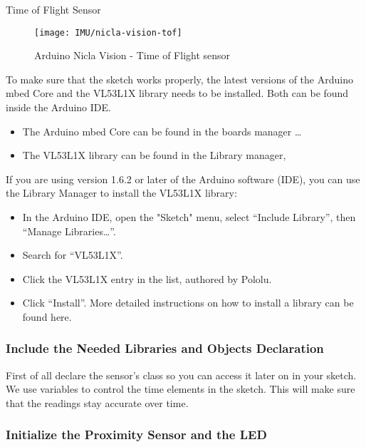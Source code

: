Time of Flight Sensor

\begin{figure}
    \centering
    
    \texttt{[image: IMU/nicla-vision-tof]}
    
    \caption{Arduino Nicla Vision - Time of Flight sensor}\label{Proximity}
\end{figure}


To make sure that the sketch works properly, the latest versions of the Arduino mbed Core and the VL53L1X library needs to be installed. Both can be found inside the Arduino IDE.

\begin{itemize}
  \item The Arduino mbed Core can be found in the boards manager \ldots
  \item The VL53L1X library can be found in the Library manager,
\end{itemize}

If you are using version 1.6.2 or later of the Arduino software (IDE), you can use the Library Manager to install the VL53L1X library:

\begin{itemize}
  \item In the Arduino IDE, open the "Sketch" menu, select ``Include Library'', then ``Manage Libraries\ldots ''.
  \item Search for ``VL53L1X''.
  \item Click the VL53L1X entry in the list, authored by Pololu.
  \item Click ``Install''. More detailed instructions on how to install a library can be found here.
\end{itemize}


\subsubsection{Include the Needed Libraries and Objects Declaration}


First of all declare the sensor's class so you can access it later on in your sketch. We use variables to control the time elements in the sketch. This will make sure that the readings stay accurate over time.

\subsubsection{Initialize the Proximity Sensor and the LED}

